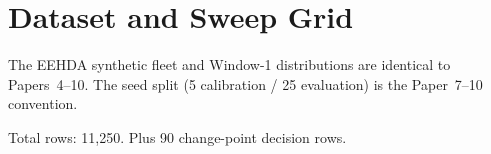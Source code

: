 \section{Dataset and Sweep Grid}

The EEHDA synthetic fleet and Window-1 distributions are identical
to Papers~4--10. The seed split (5 calibration / 25 evaluation) is
the Paper~7--10 convention.



Total rows: 11{,}250. Plus 90 change-point decision rows.
